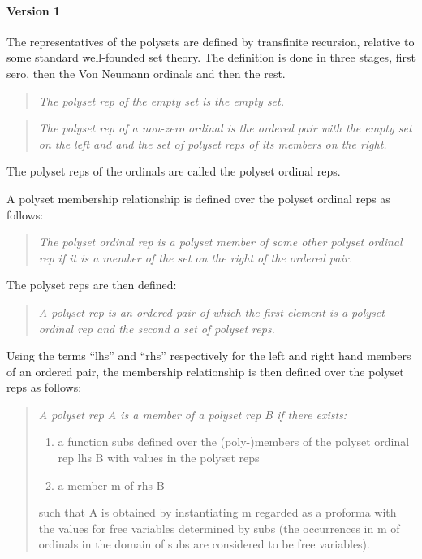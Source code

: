 \documentclass{article}
\begin{document}
\begin{article}
\paragraph{Version 1}

The representatives of the polysets are defined by transfinite recursion, relative to some standard well-founded set theory.
The definition is done in three stages, first sero, then the Von Neumann ordinals and then the rest.

\begin{quote}\label{def:polyset rep}
{\it
The polyset rep of the empty set is the empty set.
}
\end{quote}

\begin{quote}
\emph{
The polyset rep of a non-zero ordinal is the ordered pair with the empty set on the left and and the set of polyset reps of its members on the right.
}
\end{quote}

The polyset reps of the ordinals are called the polyset ordinal reps.

A polyset membership relationship is defined over the polyset ordinal reps as follows:

\begin{quote}
\emph{
The polyset ordinal rep is a polyset member of some other polyset ordinal rep if it is a member of the set on the right of the ordered pair.
}
\end{quote}

The polyset reps are then defined:

\begin{quote}
\emph{
A polyset rep is an ordered pair of which the first element is a polyset ordinal rep and the second a set of polyset reps.
}
\end{quote}

Using the terms ``lhs'' and ``rhs'' respectively for the left and right hand members of an ordered pair, the membership relationship is then defined over the polyset reps as follows:

\begin{quotation}
{\it
A polyset rep A is a member of a polyset rep B if there exists:
\begin{enumerate}
\item a function \textsf{subs} defined over the (poly-)members of the polyset ordinal rep \textsf{lhs B} with values in the polyset reps
\item a member \textsf{m} of \textsf{rhs B}
\end{enumerate}
such that A is obtained by instantiating \textsf{m} regarded as a proforma with the values for free variables determined by \textsf{subs} (the occurrences in \textsf{m} of ordinals in the domain of \textsf{subs} are considered to be free variables).
}
\end{quotation}


\end{article}
\end{document}

